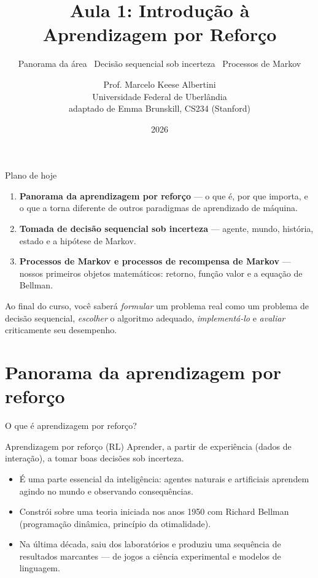 \documentclass[aspectratio=169, 11pt]{beamer}
\title[Aula 1 — Introdução à RL]{Aula 1: Introdução à\\ Aprendizagem por Reforço}
\subtitle[Aprendizagem por Reforço]{Panorama da área \textbullet\ Decisão sequencial sob incerteza \textbullet\ Processos de Markov}
\author[Prof. Marcelo K. Albertini]{Prof. Marcelo Keese Albertini \\
  \footnotesize Universidade Federal de Uberlândia \\
  \footnotesize adaptado de Emma Brunskill, CS234 (Stanford)}
\institute{Universidade Federal de Uberlândia}
\date{2026}
\begin{document}
\begin{frame}\titlepage\end{frame}

\begin{frame}{Plano de hoje}
  \begin{enumerate}
    \item \textbf{Panorama da aprendizagem por reforço} — o que é, por que
          importa, e o que a torna diferente de outros paradigmas de
          aprendizado de máquina.
    \item \textbf{Tomada de decisão sequencial sob incerteza} — agente,
          mundo, história, estado e a hipótese de Markov.
    \item \textbf{Processos de Markov e processos de recompensa de Markov} —
          nossos primeiros objetos matemáticos: retorno, função valor e a
          equação de Bellman.
  \end{enumerate}

  \bigskip
  \begin{ideiabox}
    Ao final do curso, você saberá \emph{formular} um problema real como um
    problema de decisão sequencial, \emph{escolher} o algoritmo adequado,
    \emph{implementá-lo} e \emph{avaliar} criticamente seu desempenho.
  \end{ideiabox}
\end{frame}

\section{Panorama da aprendizagem por reforço}

\begin{frame}{O que é aprendizagem por reforço?}
  \begin{defbox}{Aprendizagem por reforço (RL)}
    Aprender, a partir de \alert{experiência} (dados de interação), a tomar
    \alert{boas decisões} sob \alert{incerteza}.
  \end{defbox}

  \begin{itemize}
    \item É uma parte essencial da inteligência: agentes naturais e
          artificiais aprendem agindo no mundo e observando consequências.
    \item Constrói sobre uma teoria iniciada nos anos 1950 com Richard
          Bellman (programação dinâmica, princípio da otimalidade).
    \item Na última década, saiu dos laboratórios e produziu uma sequência
          de resultados marcantes — de jogos a ciência experimental e
          modelos de linguagem.
  \end{itemize}
\end{frame}
\end{document}
